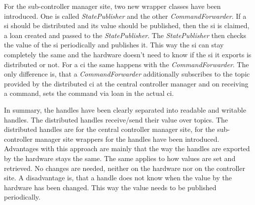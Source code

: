 For the sub-controller manager site, two new wrapper classes have been introduced. One is called \textit{StatePublisher} and the other \textit{CommandForwarder}. If a \gls{si} should be distributed and its value should be published, then the \gls{si} is claimed, a loan created and passed to the \textit{StatePublisher}. The \textit{StatePublisher} then checks the value of the \gls{si} periodically and publishes it. This way the \gls{si} can stay completely the same and the hardware doesn't need to know if the \gls{si} it exports is distributed or not. For a \gls{ci} the same happens with the \textit{CommandForwarder}. The only difference is, that a \textit{CommandForwarder} additionally subscribes to the topic provided by the distributed \gls{ci} at the central controller manager and on receiving a command, sets the command via loan in the actual \gls{ci}.

In summary, the \glspl{handle} have been clearly separated into readable and writable \glspl{handle}. The distributed \glspl{handle} receive/send their value over topics. The distributed \glspl{handle} are for the central controller manager site, for the sub-controller manager site wrappers for the handles have been introduced.\newline 
Advantages with this approach are mainly that the way the \glspl{handle} are exported by the hardware stays the same. The same applies to how values are set and retrieved. No changes are needed, neither on the hardware nor on the controller site.\newline
A disadvantage is, that a \gls{handle} does not know when the value by the hardware has been changed. This way the value needs to be published periodically.

